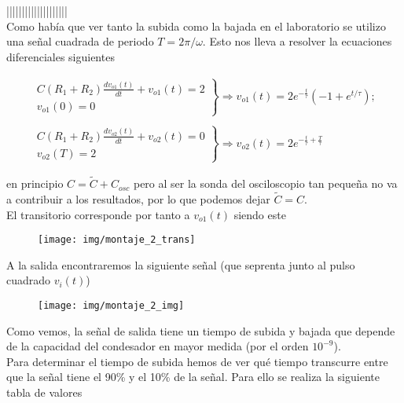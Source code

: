 \documentclass[a4paper,10pt]{article}
\begin{document}
||||||||||||||||||||\\

Como había que ver tanto la subida como la bajada en el laboratorio se utilizo una señal cuadrada de periodo $T =
2\pi/\omega$. Esto nos lleva a resolver la ecuaciones diferenciales siguientes

\begin{equation}
\begin{array}{l}
 \left.
 \begin{array}{l} \displaystyle
 C(R_1+R_2)\frac{dv_{o1}(t)}{dt} + v_{o1}(t) = 2 \\ \displaystyle
 v_{o1}(0) = 0
 \end{array} \right\} \Rightarrow v_{o1}(t) = 2 e^{-\frac{t}{\tau }} \left(-1+e^{t/\tau }\right); \\ \\
 \left.
 \begin{array}{l} \displaystyle
 C(R_1+R_2)\frac{dv_{o2}(t)}{dt} + v_{o2}(t) = 0 \\ \displaystyle
 v_{o2}(T) = 2
 \end{array} \right\} \Rightarrow v_{o2}(t) = 2 e^{-\frac{t}{\tau }+\frac{T}{\tau }} 
\end{array}
\end{equation}

en principio $ C = \tilde C + C_{osc}$ pero al ser la sonda del osciloscopio tan pequeña no va a contribuir a los
resultados, por lo que podemos dejar $\tilde C = C$. \\

El transitorio corresponde por tanto a $v_{o1}(t)$ siendo este

\begin{figure}[h!]
 \centering
 \texttt{[image: img/montaje\_2\_trans]}
 \label{fig:mont_2_trans}
\end{figure}

A la salida encontraremos la siguiente señal (que seprenta junto al pulso cuadrado $v_i(t)$)

\begin{figure}[h!]
 \centering  
  \texttt{[image: img/montaje\_2\_img]} 
\end{figure}

Como vemos, la señal de salida tiene un tiempo de subida y bajada que depende de la capacidad del condesador en mayor
medida (por el orden $10^{-9}$).\\

Para determinar el tiempo de subida hemos de ver qué tiempo transcurre entre que la señal tiene el 90\% y el 10\%
de la señal. Para ello se realiza la siguiente tabla de valores
\end{document}
